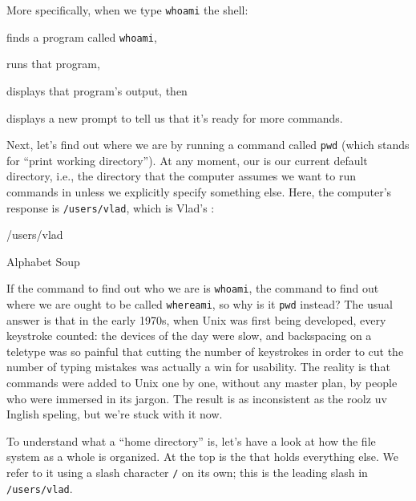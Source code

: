 \documentclass{book}
\begin{document}
More specifically, when we type \texttt{whoami} the shell:

\begin{swcenumerate}
\item
  finds a program called \texttt{whoami},
\item
  runs that program,
\item
  displays that program's output, then
\item
  displays a new prompt to tell us that it's ready for more commands.
\end{swcenumerate}

Next, let's find out where we are by running a command called
\texttt{pwd} (which stands for ``print working directory''). At any
moment, our  is our current default directory, i.e., the directory that
the computer assumes we want to run commands in unless we explicitly
specify something else. Here, the computer's response is
\texttt{/users/vlad}, which is Vlad's :


\begin{VerbOut}
/users/vlad
\end{VerbOut}

\begin{swcbox}{Alphabet Soup}

If the command to find out who we are is \texttt{whoami}, the command to
find out where we are ought to be called \texttt{whereami}, so why is it
\texttt{pwd} instead? The usual answer is that in the early 1970s, when
Unix was first being developed, every keystroke counted: the devices of
the day were slow, and backspacing on a teletype was so painful that
cutting the number of keystrokes in order to cut the number of typing
mistakes was actually a win for usability. The reality is that commands
were added to Unix one by one, without any master plan, by people who
were immersed in its jargon. The result is as inconsistent as the roolz
uv Inglish speling, but we're stuck with it now.

\end{swcbox}

To understand what a ``home directory'' is, let's have a look at how the
file system as a whole is organized. At the top is the
 that holds everything else.
We refer to it using a slash character \texttt{/} on its own; this is
the leading slash in \texttt{/users/vlad}.
\end{document}
